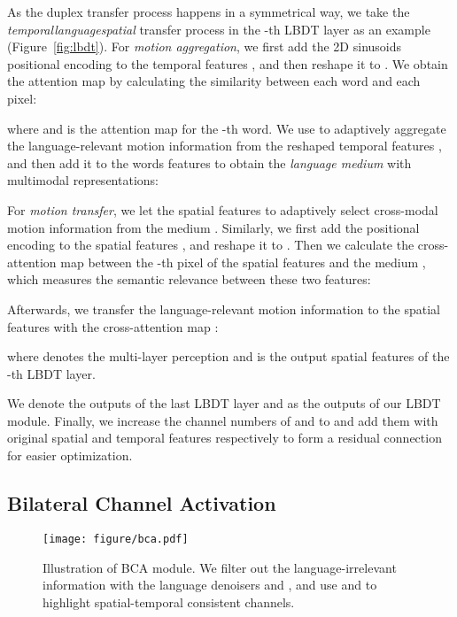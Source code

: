\documentclass[10pt,twocolumn,letterpaper]{article}
\begin{document}
As the duplex transfer process happens in a symmetrical way, we take the \textit{temporal}\textit{language}\textit{spatial} transfer process in the -th LBDT layer as an example (Figure~\ref{fig:lbdt}). For \textit{motion aggregation}, we first add the 2D sinusoids positional encoding  to the temporal features , and then reshape it to . We obtain the attention map  by calculating the similarity between each word and each pixel:


where  and  is the attention map for the -th word. We use  to adaptively aggregate the language-relevant motion information from the reshaped temporal features , and then add it to the words features  to obtain the \textit{language medium}  with multimodal representations:



For \textit{motion transfer}, we let the spatial features to adaptively select cross-modal motion information from the medium . Similarly, we first add the positional encoding  to the spatial features , and reshape it to . Then we calculate the cross-attention map  between the -th pixel of the spatial features and the medium , which measures the semantic relevance between these two features:


Afterwards, we transfer the language-relevant motion information to the spatial features with the cross-attention map :

where  denotes the multi-layer perception and  is the output spatial features of the -th LBDT layer.

We denote the outputs of the last LBDT layer  and  as the outputs of our LBDT module. Finally, we increase the channel numbers of  and  to  and add them with original spatial and temporal features respectively to form a residual connection for easier optimization.

\subsection{Bilateral Channel Activation}
\label{sec:method:tfm}

\begin{figure}[t]
	\centering
		\texttt{[image: figure/bca.pdf]}
	\caption{Illustration of BCA module. We filter out the language-irrelevant information with the language denoisers  and , and use  and  to highlight spatial-temporal consistent channels.}
\label{fig:tfm}
	
\end{figure}
\end{document}
